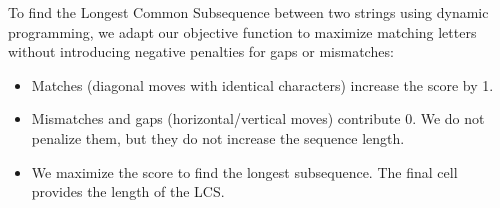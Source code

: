 To find the Longest Common Subsequence between two strings using dynamic programming, we adapt our objective function to maximize matching letters without introducing negative penalties for gaps or mismatches:
\begin{itemize}
  \item Matches (diagonal moves with identical characters) increase the score by 1.
  \item Mismatches and gaps (horizontal/vertical moves) contribute 0. We do not penalize them, but they do not increase the sequence length.
  \item We maximize the score to find the longest subsequence. The final cell provides the length of the LCS.
\end{itemize}
